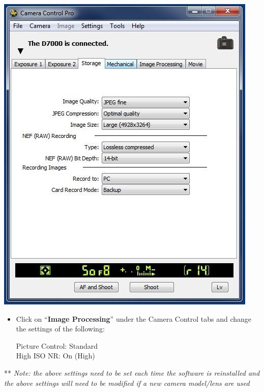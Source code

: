 \documentclass[]{book}
\begin{document}
\includegraphics{images/Camera5.jpg}

\begin{itemize}
\item
  Click on ``\textbf{Image Processing}'' under the Camera Control tabs and change the settings of the following:

  Picture Control: Standard\\
  High ISO NR: On (High)
\end{itemize}

** \emph{Note: the above settings need to be set each time the software is reinstalled and the above settings will need to be modified if a new camera model/lens are used}
\end{document}
